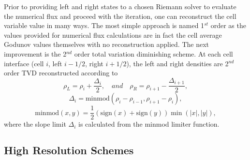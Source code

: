 	Prior to providing left and right states to a chosen Riemann solver to evaluate the numerical flux and proceed with the iteration, one can reconstruct the cell variable value in many ways. The most simple approach is named 1$^{st}$ order as the values provided for numerical flux calculations are in fact the cell average Godunov values themselves with no reconstruction applied. The next improvement is the 2$^{nd}$ order total variation diminishing scheme. At each cell interface (cell $i$, left $i-1/2$, right $i+1/2$), the left and right densities are 2$^{nd}$ order TVD reconstructed according to
	\begin{equation}
		\rho_L=\rho_i+\frac{\Delta_i}{2}, \quad and \quad \rho_R=\rho_{i+1}-\frac{\Delta_{i+1}}{2},\label{eq:tdv}
	\end{equation} 
	\begin{equation}
		\Delta_i=\mathrm{minmod}\left(\rho_i-\rho_{i-1},\rho_{i+1}-\rho_i\right), \nonumber
	\end{equation}
	\begin{equation}
		\mathrm{minmod}\left(x,y\right)=\frac{1}{2}\left(\mathrm{sign}\left(x\right)+\mathrm{sign}\left(y\right)\right)\min\left(\left|x\right|,\left|y\right|\right), \label{eq:minmod}
	\end{equation}
	where the slope limit $\Delta_i$ is calculated from the minmod limiter function.
	
\subsection{High Resolution Schemes}
\label{sec:HRS}
	
